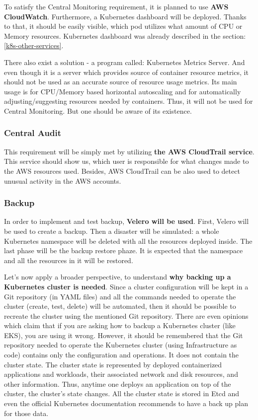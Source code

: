 To satisfy the Central Monitoring requirement, it is planned to use \textbf{AWS CloudWatch}. Furthermore, a Kubernetes dashboard will be deployed. Thanks to that, it should be easily visible, which pod utilizes what amount of CPU or Memory resources. Kubernetes dashboard was already described in the section: \ref{k8s-other-services}.

There also exist a solution - a program called: Kubernetes Metrics Server. And even though it is a server which provides source of container resource metrics, it should not be used as an accurate source of resource usage metrics. Its main usage is for CPU/Memory based horizontal autoscaling and for automatically adjusting/suggesting resources needed by containers. Thus, it will not be used for Central Monitoring. But one should be aware of its existence\cite{k8s-metrics-server}.


\subsubsection{Central Audit}

This requirement will be simply met by utilizing \textbf{the AWS CloudTrail service}. This service should show us, which user is responsible for what changes made to the AWS resources used. Besides, AWS CloudTrail can be also used to detect unusual activity in the AWS accounts\cite{online-ct}.

\subsubsection{Backup}

In order to implement and test backup, \textbf{Velero will be used}. First, Velero will be used to create a backup. Then a disaster will be simulated: a whole Kubernetes namespace will be deleted with all the resources deployed inside. The last phase will be the backup restore phaze. It is expected that the namespace and all the resources in it will be restored\cite{eksworkshop-backup}\cite{velero-examples}.

Let's now apply a broader perspective, to understand \textbf{why backing up a Kubernetes cluster is needed}. Since a cluster configuration will be kept in a Git repository (in YAML files) and all the commands needed to operate the cluster (create, test, delete) will be automated, then it should be possible to recreate the cluster using the mentioned Git repository. There are even opinions which claim that if you are asking how to backup a Kubernetes cluster (like EKS), you are using it wrong\cite{reddit-on-backup}. However, it should be remembered that the Git repository needed to operate the Kubernetes cluster (using Infrastructure as code) contains only the configuration and operations. It does not contain the cluster state. The cluster state is represented by deployed containerized applications and workloads, their associated network and disk resources, and other information\cite{k8s-concepts}. Thus, anytime one deploys an application on top of the cluster, the cluster's state changes. All the cluster state is stored in Etcd and even the official Kubernetes documentation recommends to have a back up plan for those data\cite{k8s-components}.

